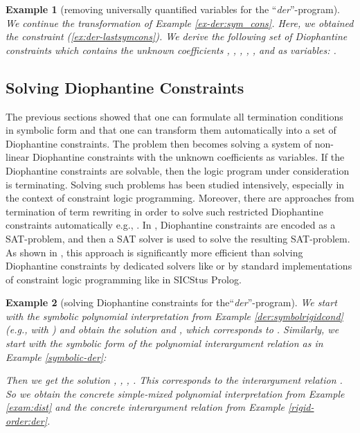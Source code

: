 \documentclass[envcountsame]{tlp}
\newcounter{ex:der-lastsymconsctr}
\newtheorem{example}{Example}
\begin{document}
\begin{example}[removing universally quantified variables for the ``\textit{der}''-program] 
\label{positivenessexample}
We continue the transformation of Example \ref{ex-der:sym_cons}. Here, we
obtained the constraint (\ref{ex:der-lastsymcons}).
We derive the following set of Diophantine 
constraints which contains the unknown coefficients ,
, , , , and 
 as variables: .
\hfill{}
\end{example}


\subsection{Solving Diophantine Constraints}
\label{Solving Diophantine Constraints}

The previous sections showed that one can formulate all termination conditions in
symbolic form and that one can transform them automatically into a set of Diophantine
constraints. The problem then becomes solving a system of non-linear
Diophantine constraints with the unknown coefficients as variables.
If the Diophantine constraints are solvable, then the logic program under
consideration is terminating. 
Solving such problems has been studied 
intensively, especially in
the context of constraint logic programming.
Moreover, there are approaches from termination of term rewriting in order to
solve such restricted Diophantine constraints automatically e.g.,
\cite{SMTCADE09,contejean05jar,Fuhsc07}.
In
\cite{Fuhsc07}, Diophantine constraints are encoded as a SAT-problem, and then a SAT
solver is used to solve the resulting SAT-problem. As shown in \cite{Fuhsc07},
this approach is significantly more efficient than solving 
Diophantine constraints by 
dedicated  solvers like \cite{contejean05jar} or by standard
implementations of constraint logic programming like in \textsf{SICStus Prolog}.


\begin{example}[solving Diophantine constraints for the``\textit{der}''-program]
\label{der:diocondsolving}
We start with the symbolic polynomial interpretation
from Example \ref{der:symbolrigidcond} (e.g., with
) 
and obtain the solution  and , 
which corresponds to
. Similarly, we
start with the symbolic form of the polynomial interargument relation as in
Example \ref{symbolic-der}:

Then we get the solution , , , .
This corresponds to the interargument relation
.
So we obtain the concrete simple-mixed polynomial interpretation from Example
\ref{exam:dist} and the concrete interargument relation from Example \ref{rigid-order:der}.
\hfill{}
\end{example}
\end{document}
